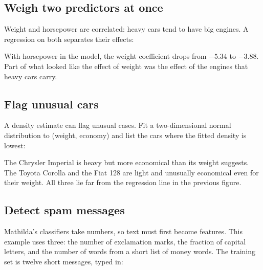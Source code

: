 \subsection*{Weigh two predictors at once}

Weight and horsepower are correlated: heavy cars tend to have big engines. A
regression on both separates their effects:

\begin{codepairs}
\end{codepairs}

With horsepower in the model, the weight coefficient drops from \(-5.34\) to
\(-3.88\). Part of what looked like the effect of weight was the effect of the
engines that heavy cars carry.

\subsection*{Flag unusual cars}

A density estimate can flag unusual cases. Fit a two-dimensional normal
distribution to (weight, economy) and list the cars where the fitted density is
lowest:

\begin{codepairs}
\end{codepairs}

The Chrysler Imperial is heavy but more economical than its weight suggests. The
Toyota Corolla and the Fiat 128 are light and unusually economical even for their
weight. All three lie far from the regression line in the previous figure.

\subsection*{Detect spam messages}

Mathilda's classifiers take numbers, so text must first become features. This
example uses three: the number of exclamation marks, the fraction of capital
letters, and the number of words from a short list of money words. The training
set is twelve short messages, typed in:

\begin{codepairs}
\end{codepairs}

